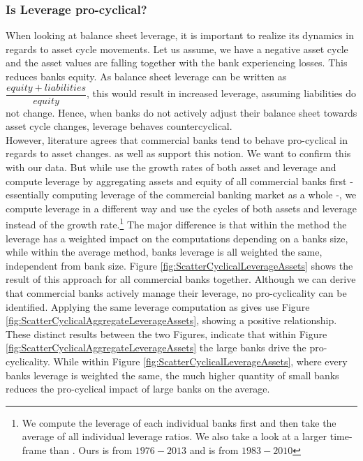 \documentclass[12pt, a4paper]{article} %
\begin{document}
\subsubsection{Is Leverage pro-cyclical?}
\label{LeverageProcyclical}
When looking at balance sheet leverage, it is important to realize its dynamics in regards to asset cycle movements.
Let us assume, we have a negative asset cycle and the asset values are falling together with the bank experiencing losses. This reduces banks equity. As balance sheet leverage can be written as $\dfrac{equity + liabilities}{equity}$, this would result in increased leverage, assuming liabilities do not change. Hence, when banks do not actively adjust their balance sheet towards asset cycle changes, leverage behaves countercyclical.\\
However, literature agrees that commercial banks tend to behave pro-cyclical in regards to asset changes. \citet{AdrianShin2011} as well as \citet{greenlaw2008leveraged} support this notion. We want to confirm this with our data. But while \citet{AdrianShin2011} use the growth rates of both asset and leverage and compute leverage by aggregating assets and equity of all commercial banks first - essentially computing leverage of the commercial banking market as a whole -, we compute leverage in a different way and use the cycles of both assets and leverage instead of the growth rate.\footnote{We compute the leverage of each individual banks first and then take the average of all individual leverage ratios. We also take a look at a larger time-frame than \citet{AdrianShin2011}. Ours is from $1976-2013$ and \citet{AdrianShin2011} is from $1983-2010$} The major difference is that within the \citet{AdrianShin2011} method the leverage has a weighted impact on the computations depending on a banks size, while within the average method, banks leverage is all weighted the same, independent from bank size. Figure \ref{fig:ScatterCyclicalLeverageAssets} shows the result of this approach for all commercial banks together. Although we can derive that commercial banks actively manage their leverage, no pro-cyclicality can be identified. 
Applying the same leverage computation as \citet{AdrianShin2011} gives use Figure \ref{fig:ScatterCyclicalAggregateLeverageAssets}, showing a positive relationship. 
These distinct results between the two Figures, indicate that within Figure \ref{fig:ScatterCyclicalAggregateLeverageAssets} the large banks drive the pro-cyclicality. While within Figure \ref{fig:ScatterCyclicalLeverageAssets}, where every banks leverage is weighted the same, the much higher quantity of small banks reduces the pro-cyclical impact of large banks on the average.
\end{document}
